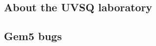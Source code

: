 \documentclass{article}
\begin{document}
\begin{multicols}{2}
\subsection{About the UVSQ laboratory}

\subsection{Gem5 bugs}

\end{multicols}
\end{document}
